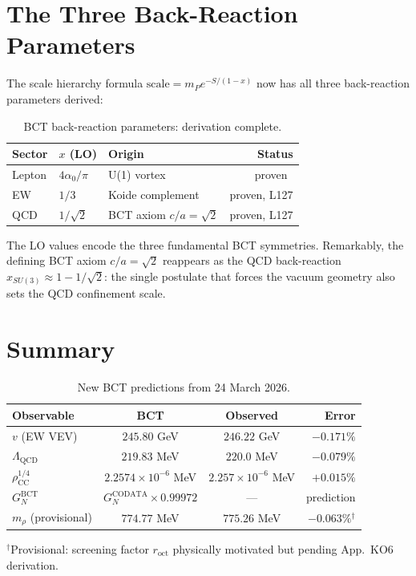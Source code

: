 \documentclass[aps,prl,twocolumn,showpacs,preprintnumbers]{revtex4-2}
\newcommand{\roct}{r_{\mathrm{oct}}}
\newcommand{\azero}{\alpha_0}
\newcommand{\mP}{m_P}
\newcommand{\LQCD}{\Lambda_{\mathrm{QCD}}}
\newcommand{\rhoCC}{\rho_{\mathrm{CC}}}
\begin{document}
\section{The Three Back-Reaction Parameters}

The scale hierarchy formula $\mathrm{scale} = \mP e^{-S/(1-x)}$
now has all three back-reaction parameters derived:

\begin{table}[h]
\centering
\caption{BCT back-reaction parameters: derivation complete.}
\label{tab:x}
\begin{tabular}{lllr}
\toprule
Sector & $x$ (LO) & Origin & Status \\
\midrule
Lepton & $4\azero/\pi$ & U(1) vortex & proven~\cite{appAY} \\
EW     & $1/3$         & Koide complement & proven, L127 \\
QCD    & $1/\sqrt{2}$  & BCT axiom $c/a=\sqrt{2}$ & proven, L127 \\
\bottomrule
\end{tabular}
\end{table}

The LO values encode the three fundamental BCT symmetries.
Remarkably, the defining BCT axiom $c/a = \sqrt{2}$ reappears
as the QCD back-reaction $x_{SU(3)} \approx 1-1/\sqrt{2}$:
the single postulate that forces the vacuum geometry also
sets the QCD confinement scale.

\section{Summary}

\begin{table}[h]
\centering
\caption{New BCT predictions from 24 March 2026.}
\label{tab:summary}
\begin{tabular}{lccr}
\toprule
Observable & BCT & Observed & Error \\
\midrule
$v$ (EW VEV)           & $245.80$ GeV            & $246.22$ GeV & $-0.171\%$ \\
$\LQCD$                & $219.83$ MeV            & $220.0$ MeV  & $-0.079\%$ \\
$\rhoCC^{1/4}$         & $2.2574\times10^{-6}$ MeV & $2.257\times10^{-6}$ MeV & $+0.015\%$ \\
$G_N^{\mathrm{BCT}}$   & $G_N^{\mathrm{CODATA}}\times0.99972$ & --- & prediction \\
$m_\rho$ (provisional) & $774.77$ MeV            & $775.26$ MeV & $-0.063\%$$^\dag$ \\
\bottomrule
\end{tabular}
\end{table}
{\footnotesize $^\dag$Provisional: screening factor $\roct$ physically
motivated but pending App.~KO6 derivation.}
\end{document}
